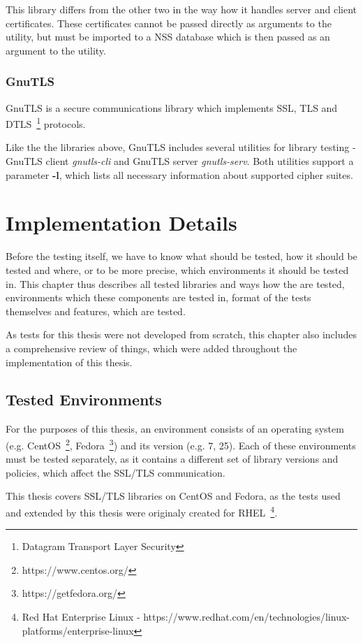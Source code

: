     This library differs from the other two in the way how it handles
    server and client certificates. These certificates cannot be passed
    directly as arguments to the utility, but must be imported to a NSS
    database which is then passed as an argument to the utility.

\subsection{GnuTLS}
    GnuTLS is a secure communications library which implements SSL, TLS and
    DTLS~\footnote{Datagram Transport Layer Security} protocols.

    Like the the libraries above, GnuTLS includes several utilities for library
    testing - GnuTLS client \textit{gnutls-cli} and GnuTLS server
    \textit{gnutls-serv}. Both utilities support a parameter \textbf{-l},
    which lists all necessary information about supported cipher suites.


\chapter{Implementation Details}
    Before the testing itself, we have to know what should be tested, how it
    should be tested and where, or to be more precise, which environments it
    should be tested in. This chapter thus describes all tested libraries
    and ways how the are tested, environments which these components are
    tested in, format of the tests themselves and features, which are tested.

    As tests for this thesis were not developed from scratch, this chapter
    also includes a comprehensive review of things, which were added
    throughout the implementation of this thesis.

\section{Tested Environments}
    For the purposes of this thesis, an environment consists of an operating
    system (e.g.
    CentOS~\footnote{https://www.centos.org/},
    Fedora~\footnote{https://getfedora.org/}) and its version
    (e.g. 7, 25). Each of these environments must be tested separately, as
    it contains a different set of library versions and policies, which
    affect the SSL/TLS communication.

    This thesis covers SSL/TLS libraries on CentOS and Fedora, as the tests used
    and extended by this thesis were originaly created for
    RHEL~\footnote{Red Hat Enterprise Linux -
    https://www.redhat.com/en/technologies/linux-platforms/enterprise-linux}.


